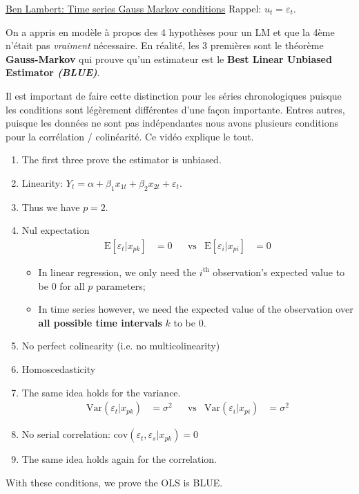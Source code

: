 \documentclass[12pt, titlepage, french]{report}
\begin{document}
\begin{YTB_SUMM}{\href{https://www.youtube.com/watch?v=bWo_ka37szw&list=PLvo9ZnEQG5oXC-cg8ecXr6SJZWprEL1UC&index=3}{Ben Lambert: Time series Gauss Markov conditions}}
Rappel: $u_{t} = \varepsilon_{t}$.

On a appris en modèle à propos des 4 hypothèses pour un LM et que la 4ème n'était pas \textit{vraiment} nécessaire. En réalité, les 3 premières sont le théorème \textbf{Gauss-Markov} qui prouve qu'un estimateur est le \textbf{Best Linear Unbiased Estimator \textit{(BLUE)}}. 

Il est important de faire cette distinction pour les séries chronologiques puisque les conditions sont légèrement différentes d'une façon importante. Entres autres, puisque les données ne sont pas indépendantes nous avons plusieurs conditions pour la corrélation / colinéarité. Ce vidéo explique le tout.
\begin{enumerate}
	\item[]	The first three prove the estimator is unbiased.
	\item	Linearity: $Y_{t} = \alpha + \beta_{1} x_{1t} + \beta_{2} x_{2t} + \varepsilon_{t}$.
	\item[]	Thus we have $p = 2$.
	\item	Nul expectation
	\begin{align*}
		\text{E}[\varepsilon_{t} | x_{pk}] &=	0	&
		&\text{vs}	&
		\text{E}[\varepsilon_{i} | x_{pi}] &=	0
	\end{align*}
	\begin{itemize}
		\item	In linear regression, we only need the $i^{\text{th}}$ observation's expected value to be 0 for all $p$ parameters;
		\item	In time series however, we need the expected value of the observation over \textbf{all possible time intervals} $k$ to be 0. 
	\end{itemize}
	\item	No perfect colinearity (i.e. no multicolinearity)
	\item	Homoscedasticity
	\item[]	The same idea holds for the variance.
	\begin{align*}
		\text{Var}(\varepsilon_{t} | x_{pk}) &= \sigma^{2}	&
		&\text{vs}	&
		\text{Var}(\varepsilon_{i} | x_{pi}) &= \sigma^{2}
	\end{align*}
	\item	No serial correlation: $\text{cov}(\varepsilon_{t}, \varepsilon_{s} | x_{pk}) = 0$
	\item[]	The same idea holds again for the correlation.
\end{enumerate}
With these conditions, we prove the OLS is BLUE.
\end{YTB_SUMM}
\end{document}
